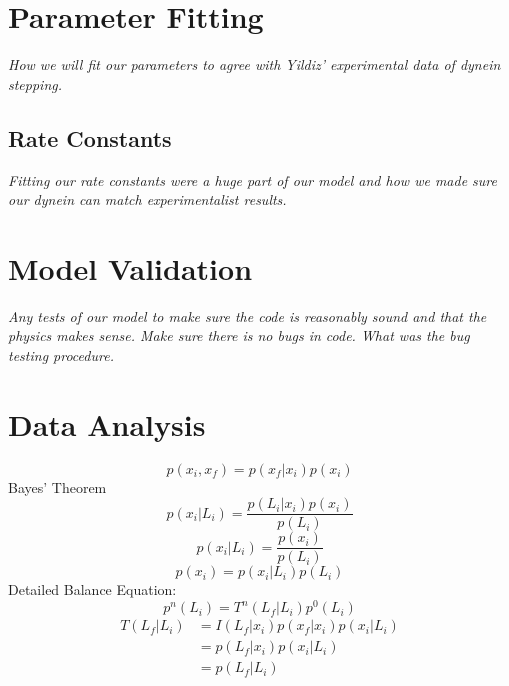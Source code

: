 \section{Parameter Fitting}
\textit{How we will fit our parameters to agree with Yildiz' experimental data of dynein stepping.}

\subsection{Rate Constants}
\textit{Fitting our rate constants were a huge part of our model and how we made sure our dynein can match experimentalist results.}

\section{Model Validation}
\textit{Any tests of our model to make sure the code is reasonably sound and that the physics makes sense. Make sure there is no bugs in code. What was the bug testing procedure.}

\section{Data Analysis} \label{sec:DataAna}
\begin{equation}
	p(x_i,x_f)=p(x_f|x_i)p(x_i)
\end{equation}
Bayes' Theorem
\begin{equation}
	p(x_i|L_i)=\frac{p(L_i|x_i)p(x_i)}{p(L_i)}
\end{equation}
\[
	p(x_i|L_i)=\frac{p(x_i)}{p(L_i)} 
\]\[
	p(x_i)=p(x_i|L_i)p(L_i)
\]
Detailed Balance Equation:
\begin{equation}
	p^n(L_i)=T^n(L_f|L_i)p^0(L_i)
\end{equation}
\begin{align}
	T(L_f|L_i)&=I(L_f|x_i)p(x_f|x_i)p(x_i|L_i)\\
	&=p(L_f|x_i)p(x_i|L_i)\\
	&=p(L_f|L_i)
\end{align}



